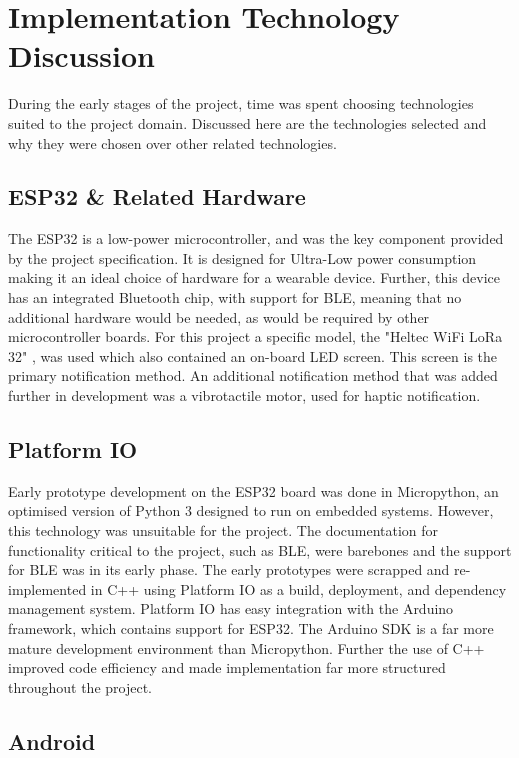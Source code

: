 \documentclass{l4proj}
\begin{document}
\section{Implementation Technology Discussion}

During the early stages of the project, time was spent choosing technologies suited to the project domain. Discussed here are the technologies selected and why they were chosen over other related technologies.

\subsection{ESP32 \& Related Hardware}

The ESP32 is a low-power microcontroller, and was the key component provided by the project specification. It is designed for Ultra-Low power consumption making it an ideal choice of hardware for a wearable device. Further, this device has an integrated Bluetooth chip, with support for BLE, meaning that no additional hardware would be needed, as would be required by other microcontroller boards. For this project a specific model, the "Heltec WiFi LoRa 32" \citep{heltec_automation_wifi_nodate}, was used which also contained an on-board LED screen. This screen is the primary notification method. An additional notification method that was added further in development was a vibrotactile motor, used for haptic notification.

\subsection{Platform IO}

Early prototype development on the ESP32 board was done in Micropython, an optimised version of Python 3 designed to run on embedded systems. However, this technology was unsuitable for the project. The documentation for functionality critical to the project, such as BLE, were barebones and the support for BLE was in its early phase. The early prototypes were scrapped and re-implemented in C++ using Platform IO as a build, deployment, and dependency management system. Platform IO has easy integration with the Arduino framework, which contains support for ESP32. The Arduino SDK is a far more mature development environment than Micropython. Further the use of C++ improved code efficiency and made implementation far more structured throughout the project.

\subsection{Android}
\end{document}
